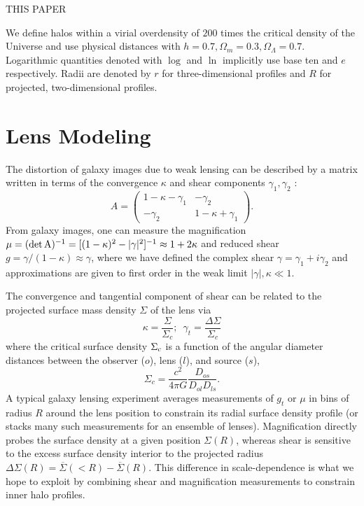 \documentclass[12pt]{emulateapj}
\begin{document}
THIS PAPER

We define halos within a virial overdensity of $200$ times the
critical density of the Universe and use physical distances with
$h=0.7, \Omega_m=0.3, \Omega_\Lambda=0.7$. Logarithmic quantities
denoted with $\log$ and $\ln$ implicitly use base ten and $e$
respectively. Radii are denoted by $r$ for three-dimensional profiles
and $R$ for projected, two-dimensional profiles.

\section{Lens Modeling}
\label{sec:model}

The distortion of galaxy images due to weak lensing can be described
by a matrix written in terms of the convergence $\kappa$ and shear
components $\gamma_1, \gamma_2$ \citep[e.g.][]{Bartelmann2001}:
\begin{equation}
A = \left( \begin{array}{cc}
1 - \kappa -\gamma_1 & -\gamma_2 \\
-\gamma_2 & 1 - \kappa + \gamma_1 \end{array} \right).
\end{equation}
From galaxy images, one can measure the magnification 
$\mu = (\rm{det}\,A)^{-1} = [(1-\kappa)^2 - |\gamma|^2]^{-1} \approx 1+2\kappa$
and reduced shear $g = \gamma / (1-\kappa) \approx \gamma$, where we have defined the
complex shear $\gamma=\gamma_1 + i\gamma_2$ and approximations are
given to first order in the weak limit $|\gamma|,\kappa \ll 1$.

The convergence and tangential component of shear can be related to the
projected surface mass density $\Sigma$ of the lens via
\begin{equation}
\kappa = \frac{\Sigma}{\Sigma_c}; \,\,\, \gamma_t = \frac{\Delta\Sigma}{\Sigma_c}
\end{equation}
where the critical surface density $\Sigma_{\rm  c}$ is a function of
the angular diameter distances between the observer ($o$), lens ($l$),
and source ($s$),
\begin{equation}
\Sigma_{c}=\frac{c^2}{4\pi G}\frac{D_{os}}{D_{ol}D_{ls}}.
\end{equation}
A typical galaxy lensing experiment averages measurements of $g_t$ or $\mu$ in
bins of radius $R$ around the lens position to constrain its radial
surface density profile (or stacks many such measurements for an
ensemble of lenses). Magnification directly probes the surface density
at a given position $\Sigma(R)$, whereas shear is sensitive to the
excess surface density interior to the projected radius
$\Delta\Sigma(R) = \overline{\Sigma}(<R) - \overline{\Sigma}(R)$. This
difference in scale-dependence is what we hope to exploit by combining
shear and magnification measurements to constrain inner halo profiles.
\end{document}

